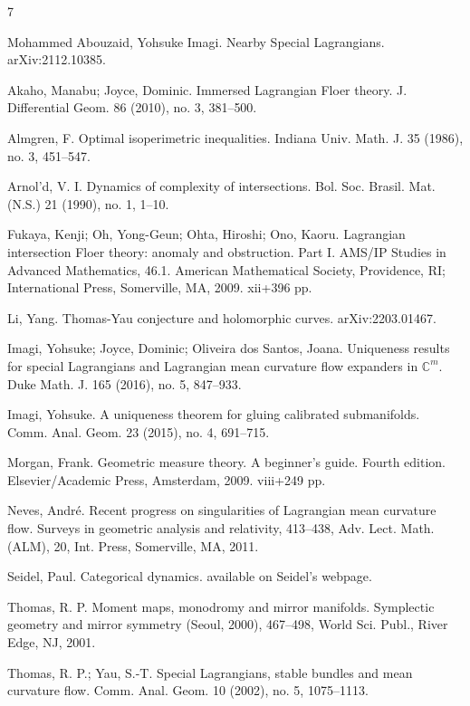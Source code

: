 \documentclass[a4paper]{article}
\theoremstyle{definition}
\begin{document}
\begin{thebibliography}{7}
	
	
	
	
Mohammed Abouzaid, Yohsuke Imagi. Nearby Special Lagrangians. 	arXiv:2112.10385.




Akaho, Manabu; Joyce, Dominic. Immersed Lagrangian Floer theory. J. Differential Geom. 86 (2010), no. 3, 381--500. 



Almgren, F. Optimal isoperimetric inequalities. Indiana Univ. Math. J. 35 (1986), no. 3, 451--547.



Arnol'd, V. I. Dynamics of complexity of intersections. Bol. Soc. Brasil. Mat. (N.S.) 21 (1990), no. 1, 1--10.



Fukaya, Kenji; Oh, Yong-Geun; Ohta, Hiroshi; Ono, Kaoru. Lagrangian intersection Floer theory: anomaly and obstruction. Part I. AMS/IP Studies in Advanced Mathematics, 46.1. American Mathematical Society, Providence, RI; International Press, Somerville, MA, 2009. xii+396 pp.

   

Li, Yang. Thomas-Yau conjecture and holomorphic curves. 	arXiv:2203.01467.


Imagi, Yohsuke; Joyce, Dominic; Oliveira dos Santos, Joana. Uniqueness results for special Lagrangians and Lagrangian mean curvature flow expanders in $\mathbb{C}^m$. Duke Math. J. 165 (2016), no. 5, 847--933.




Imagi, Yohsuke. A uniqueness theorem for gluing calibrated submanifolds. Comm. Anal. Geom. 23 (2015), no. 4, 691--715.


Morgan, Frank. Geometric measure theory. A beginner's guide. Fourth edition. Elsevier/Academic Press, Amsterdam, 2009. viii+249 pp. 



Neves, André. Recent progress on singularities of Lagrangian mean curvature flow. Surveys in geometric analysis and relativity, 413--438, Adv. Lect. Math. (ALM), 20, Int. Press, Somerville, MA, 2011. 



Seidel, Paul. Categorical dynamics. available on Seidel's webpage.



Thomas, R. P. Moment maps, monodromy and mirror manifolds. Symplectic geometry and mirror symmetry (Seoul, 2000), 467--498, World Sci. Publ., River Edge, NJ, 2001.


Thomas, R. P.; Yau, S.-T. Special Lagrangians, stable bundles and mean curvature flow. Comm. Anal. Geom. 10 (2002), no. 5, 1075--1113.
	
\end{thebibliography}	
\end{document}
